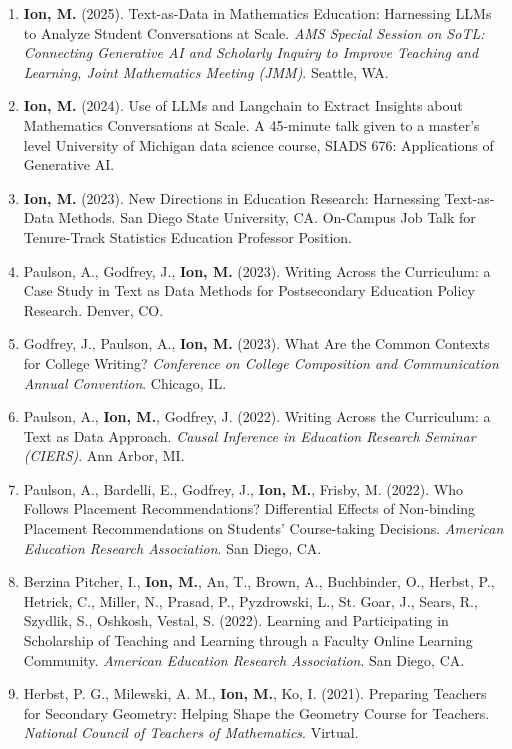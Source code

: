 \documentclass[a4paper,11pt]{article}
\newcommand{\yearsitem}[1]{%
  \item {\reversemarginpar\strut\marginnote{{\small#1}}}%
}
\begin{document}
\begin{enumerate}
\yearsitem{2025}\textbf{Ion, M.} (2025). Text-as-Data in Mathematics Education: Harnessing LLMs to Analyze Student Conversations at Scale. \emph{AMS Special Session on SoTL: Connecting Generative AI and Scholarly Inquiry to Improve Teaching and Learning, Joint Mathematics Meeting (JMM)}. Seattle, WA.

\yearsitem{2024}\textbf{Ion, M.} (2024). Use of LLMs and Langchain to Extract Insights about Mathematics Conversations at Scale. A 45-minute talk given to a master's level University of Michigan data science course, SIADS 676: Applications of Generative AI.

\yearsitem{2023}\textbf{Ion, M.} (2023). New Directions in Education Research: Harnessing Text-as-Data Methods. San Diego State University, CA. On-Campus Job Talk for Tenure-Track Statistics Education Professor Position.

\item Paulson, A., Godfrey, J., \textbf{Ion, M.} (2023). Writing Across the Curriculum: a Case Study in Text as Data Methods for Postsecondary Education Policy Research. Denver, CO.

\item Godfrey, J., Paulson, A., \textbf{Ion, M.} (2023). What Are the Common Contexts for College Writing? \emph{Conference on College Composition and Communication Annual Convention}. Chicago, IL.

\yearsitem{2022}Paulson, A., \textbf{Ion, M.}, Godfrey, J. (2022). Writing Across the Curriculum: a Text as Data Approach. \emph{Causal Inference in Education Research Seminar (CIERS)}. Ann Arbor, MI.

\item Paulson, A., Bardelli, E., Godfrey, J., \textbf{Ion, M.}, Frisby, M. (2022). Who Follows Placement Recommendations? Differential Effects of Non-binding Placement Recommendations on Students' Course-taking Decisions. \emph{American Education Research Association}. San Diego, CA.

\item Berzina Pitcher, I., \textbf{Ion, M.}, An, T., Brown, A., Buchbinder, O., Herbst, P., Hetrick, C., Miller, N., Prasad, P., Pyzdrowski, L., St. Goar, J., Sears, R., Szydlik, S., Oshkosh, Vestal, S. (2022). Learning and Participating in Scholarship of Teaching and Learning through a Faculty Online Learning Community. \emph{American Education Research Association}. San Diego, CA.

\yearsitem{2021}Herbst, P. G., Milewski, A. M., \textbf{Ion, M.}, Ko, I. (2021). Preparing Teachers for Secondary Geometry: Helping Shape the Geometry Course for Teachers. \emph{National Council of Teachers of Mathematics}. Virtual.


\end{enumerate}
\end{document}
